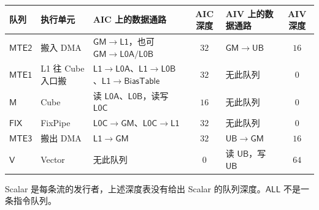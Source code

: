 \documentclass[UTF8,a4paper,11pt,fontset=fandol]{ctexart}
\begin{document}
\begin{center}
\small
\begin{tabularx}{\linewidth}{@{}llYcYc@{}}
\toprule
队列 & 执行单元 & AIC 上的数据通路 & AIC 深度
  & AIV 上的数据通路 & AIV 深度 \\
\midrule
$\mathsf{MTE2}$ & 搬入 DMA
  & $\mathsf{GM}\to\mathsf{L1}$，也可 $\mathsf{GM}\to\mathsf{L0A}/\mathsf{L0B}$ & $32$
  & $\mathsf{GM}\to\mathsf{UB}$ & $16$ \\
$\mathsf{MTE1}$ & L1 往 Cube 入口搬
  & $\mathsf{L1}\to\mathsf{L0A}$、$\mathsf{L1}\to\mathsf{L0B}$、$\mathsf{L1}\to\mathsf{BiasTable}$ & $32$
  & 无此队列 & $0$ \\
$\mathsf{M}$ & Cube
  & 读 $\mathsf{L0A}$、$\mathsf{L0B}$，读写 $\mathsf{L0C}$ & $16$
  & 无此队列 & $0$ \\
$\mathsf{FIX}$ & FixPipe
  & $\mathsf{L0C}\to\mathsf{GM}$、$\mathsf{L0C}\to\mathsf{L1}$ & $32$
  & 无此队列 & $0$ \\
$\mathsf{MTE3}$ & 搬出 DMA
  & $\mathsf{L1}\to\mathsf{GM}$ & $32$
  & $\mathsf{UB}\to\mathsf{GM}$ & $16$ \\
$\mathsf{V}$ & Vector
  & 无此队列 & $0$
  & 读 $\mathsf{UB}$，写 $\mathsf{UB}$ & $64$ \\
\bottomrule
\end{tabularx}
\end{center}

\noindent
Scalar 是每条流的发行者，上述深度表没有给出 Scalar 的队列深度。$\mathsf{ALL}$ 不是一条指令队列。
\end{document}
